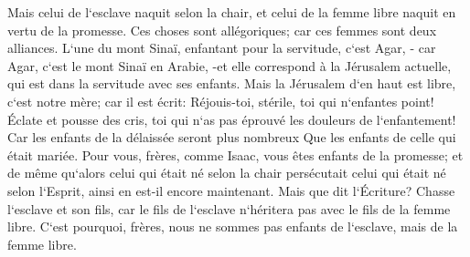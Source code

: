 \verse Mais celui de l`esclave naquit selon la chair, et celui de la femme libre naquit en vertu de la promesse. 
\verse Ces choses sont allégoriques; car ces femmes sont deux alliances. L`une du mont Sinaï, enfantant pour la servitude, c`est Agar, - 
\verse car Agar, c`est le mont Sinaï en Arabie, -et elle correspond à la Jérusalem actuelle, qui est dans la servitude avec ses enfants. 
\verse Mais la Jérusalem d`en haut est libre, c`est notre mère; 
\verse car il est écrit: Réjouis-toi, stérile, toi qui n`enfantes point! Éclate et pousse des cris, toi qui n`as pas éprouvé les douleurs de l`enfantement! Car les enfants de la délaissée seront plus nombreux Que les enfants de celle qui était mariée. 
\verse Pour vous, frères, comme Isaac, vous êtes enfants de la promesse; 
\verse et de même qu`alors celui qui était né selon la chair persécutait celui qui était né selon l`Esprit, ainsi en est-il encore maintenant. 
\verse Mais que dit l`Écriture? Chasse l`esclave et son fils, car le fils de l`esclave n`héritera pas avec le fils de la femme libre. 
\verse C`est pourquoi, frères, nous ne sommes pas enfants de l`esclave, mais de la femme libre. 

